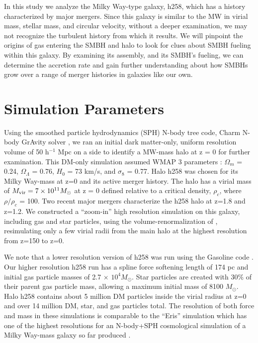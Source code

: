 \documentclass[]{emulateapj}
\begin{document}
In this study we analyze the Milky Way-type galaxy, h258, which has a history characterized by major mergers. Since this galaxy is similar to the MW in virial mass, stellar mass, and circular velocity, without a deeper examination, we may not recognize the turbulent history from which it results. We will pinpoint the origins of gas entering the SMBH and halo to look for clues about SMBH fueling within this galaxy. By examining its assembly, and its SMBH's fueling, we can determine the accretion rate and gain further understanding about how SMBHs grow over a range of merger histories in galaxies like our own.




\section{Simulation Parameters}\label{sec-model}

Using the smoothed particle hydrodynamics (SPH) N-body tree code, Charm N-body GrAvity solver \citep[ChaNGa;][]{Menon2015}, we ran an initial dark matter-only, uniform resolution volume of 50 h$^{-1}$ Mpc on a side to identify a MW-mass halo at z = 0 for further examination. This DM-only simulation assumed WMAP 3 parameters \citep{Spergel2007}: $\Omega_m$ = 0.24, $\Omega_{\Lambda}$ = 0.76, $H_0$ = 73 km/s, and $\sigma _8$ = 0.77. Halo h258 was chosen for its Milky Way-mass at z=0 and its active merger history. The halo has a virial mass of $M_{\rm vir} = 7 \times 10^{11} M_{\odot}$ at z = 0 defined relative to a critical density, $\rho_c$, where $\rho / \rho_c$ = 100. Two recent major mergers characterize the h258 halo at z=1.8 and z=1.2. We constructed a ``zoom-in'' high resolution simulation on this galaxy, including gas and star particles, using the volume-renormalization of \cite{Katz1993}, resimulating only a few virial radii from the main halo at the highest resolution from z=150 to z=0.  

We note that a lower resolution version of h258 was run using the Gasoline code \citep{Wadsley2004}. Our higher resolution h258 run has a spline force softening length of 174 pc and initial gas particle masses of 2.7 $\times$ $10^4 M_{\odot}$. Star particles are created with 30$\%$ of their parent gas particle mass, allowing a maximum initial mass of 8100 $M_{\odot}$. Halo h258 contains about 5 million DM particles inside the virial radius at z=0 and over 14 million DM, star, and gas particles total. The resolution of both force and mass in these simulations is comparable to the ``Eris'' simulation which has one of the highest resolutions for an N-body+SPH cosmological simulation of a Milky Way-mass galaxy so far produced \citep{Guedes2011}.  
\end{document}
